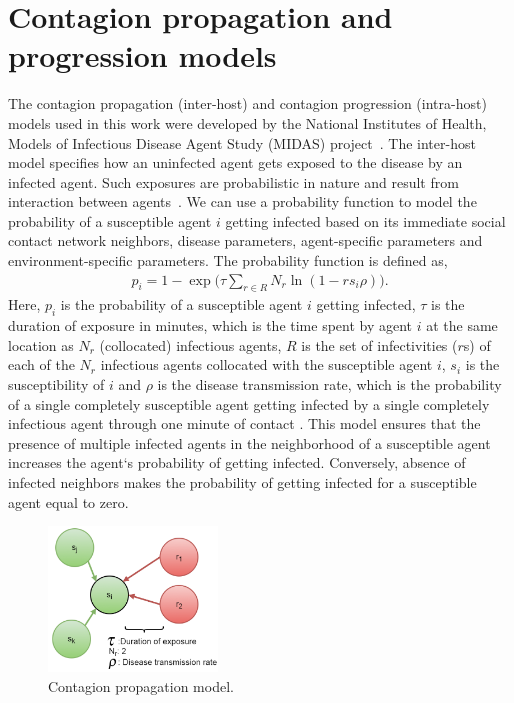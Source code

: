 \documentclass[doublespace]{VTthesis}
\begin{document}
    \section{Contagion propagation and progression models}
    \label{sec:4.2}
    The contagion propagation (inter-host) and contagion progression (intra-host) models used in this work were developed by the National Institutes of Health, Models of Infectious Disease Agent Study (MIDAS) project~\cite{nih09midas}. The inter-host model specifies how an uninfected agent gets exposed to the disease by an infected agent. Such exposures are probabilistic in nature and result from interaction between agents~\cite{barrett2006modeling}. We can use a probability function to model the probability of a susceptible agent $i$ getting infected based on its immediate social contact network neighbors, disease parameters, agent-specific parameters and environment-specific parameters. The probability function is defined as,
    \begin{align}
    p_i = 1 - \exp \Bigg(  \tau \sum_{r \in R} N_r \ln (1-r s_i \rho) \Bigg).
    \label{eqn:1}
    \end{align}
    Here, $p_i$ is the probability of a susceptible agent $i$ getting infected, $\tau$ is the duration of exposure in minutes, which is the time spent by agent $i$ at the same location as $N_r$ (collocated) infectious agents, $R$ is the set of infectivities ($r$s) of each of the $N_r$ infectious agents collocated with the susceptible agent $i$, $s_i$ is the susceptibility of $i$ and $\rho$ is the disease transmission rate, which is the probability of a single completely susceptible agent getting infected by a single completely infectious agent through one minute of contact \cite{barrett2007modeling}. This model ensures that the presence of multiple infected agents in the neighborhood of a susceptible agent increases the agent`s probability of getting infected. Conversely, absence of infected neighbors makes the probability of getting infected for a susceptible agent equal to zero. 
    \begin{figure}
    \centering
    \includegraphics[width=0.4\textwidth]{figures/dpm.png}
    \caption{Contagion propagation model.}
    \label{fig:dpm}
    \end{figure}
    
\end{document}
